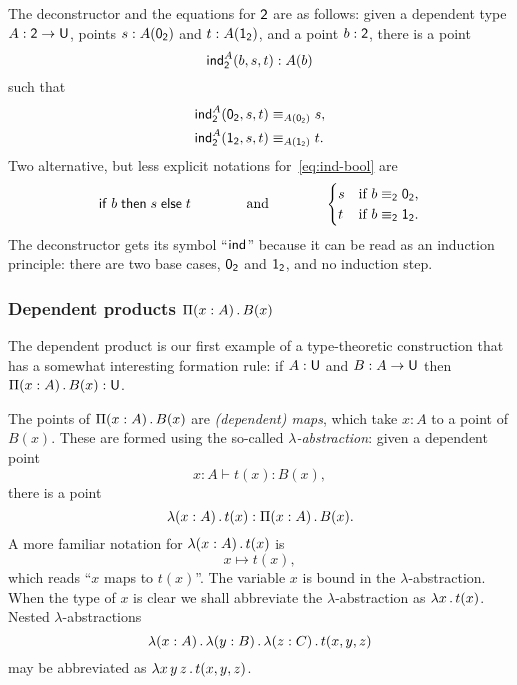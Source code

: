 \documentclass{amsart}
\begin{document}
The deconstructor and the equations for $\mathsf{2}$ are as follows: given a
dependent type $A : \mathsf{2} \to \mathsf{U}$, points $s : A(\mathsf{0}_{\mathsf{2}})$ and
$t : A(\mathsf{1}_{\mathsf{2}})$, and a point $b : \mathsf{2}$, there is a point
%
\begin{equation}
  \label{eq:ind-bool}%
  \ind{\Bool}^A(b, s, t) : A(b)
\end{equation}
%
such that
%
\begin{align*}
  \mathsf{ind}_{\mathsf{2}}^A(\mathsf{0}_{\mathsf{2}}, s, t) &\equiv_{A(\mathsf{0}_{\mathsf{2}})} s, \\
  \mathsf{ind}_{\mathsf{2}}^A(\mathsf{1}_{\mathsf{2}}, s, t) &\equiv_{A(\mathsf{1}_{\mathsf{2}})} t.
\end{align*}
%
Two alternative, but less explicit notations for~\eqref{eq:ind-bool} are
%
\begin{equation*}
  \mathsf{if}\;b\;\mathsf{then}\;s\;\mathsf{else}\;t
  \qquad
  \qquad
  \text{and}
  \qquad
  \qquad
  \begin{cases}
    s & \text{if $b \equiv_{\mathsf{2}} \mathsf{0}_{\mathsf{2}}$,} \\
    t & \text{if $b \equiv_{\mathsf{2}} \mathsf{1}_{\mathsf{2}}$.}
  \end{cases}
\end{equation*}
%
The deconstructor gets its symbol ``$\mathsf{ind}_{}$'' because it can be read as an
induction principle: there are two base cases, $\mathsf{0}_{\mathsf{2}}$ and $\mathsf{1}_{\mathsf{2}}$, and no
induction step.


\subsubsection{Dependent products $\Pi(x : A) \,.\, B(x)$}
\label{sec:product}

The dependent product is our first example of a type-theoretic construction that
has a somewhat interesting formation rule: if $A : \mathsf{U}$ and $B : A \to \mathsf{U}$
then $\Pi(x : A) \,.\, B(x) : \mathsf{U}$.

The points of $\Pi(x : A) \,.\, B(x)$ are \emph{(dependent) maps}, which take $x : A$ to a point of $B(x)$.
These are formed using the so-called \emph{$\lambda$-abstraction}: given a dependent point
%
\begin{equation*}
  x : A \vdash t(x) : B(x),
\end{equation*}
%
there is a point
%
\begin{equation*}
  \lambda (x : A) \,.\, t(x) : \Pi(x : A) \,.\, B(x).
\end{equation*}
%
A more familiar notation for $\lambda (x : A) \,.\, t(x)$ is
%
\begin{equation*}
  x \mapsto t(x),
\end{equation*}
%
which reads ``$x$ maps to $t(x)$''. The variable $x$ is bound in the
$\lambda$-abstraction. When the type of $x$ is clear we shall abbreviate the
$\lambda$-abstraction as $\lambda x \,.\, t(x)$. Nested $\lambda$-abstractions
%
\begin{equation*}
  \lambda (x : A) \,.\, \lambda (y : B) \,.\, \lambda (z : C) \,.\, t(x,y,z)
\end{equation*}
%
may be abbreviated as $\lambda x\, y\, z \,.\, t(x,y,z)$.
\end{document}
